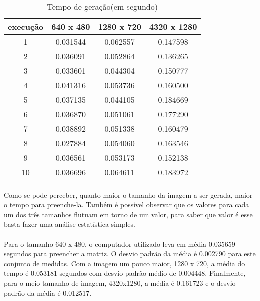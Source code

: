 \documentclass{article}
\begin{document}
	\begin{table}[ht]
	\caption{Tempo de geração(em segundo)}
	\centering
	\begin{tabular}{c c c c}
	\hline\hline
	execução & 640 x 480 & 1280 x 720 & 4320 x 1280\\
	\hline
	1 & 0.031544 & 0.062557 & 0.147598\\
	2 & 0.036091 & 0.052864 & 0.136265\\
	3 & 0.033601 & 0.044304 & 0.150777\\
	4 & 0.041316 & 0.053736 & 0.160500\\
	5 & 0.037135 & 0.044105 & 0.184669\\
	6 & 0.036870 & 0.051061 & 0.177290\\
	7 & 0.038892 & 0.051338 & 0.160479\\
	8 & 0.027884 & 0.054060 & 0.163546\\
	9 & 0.036561 & 0.053173 & 0.152138\\
	10 & 0.036696 & 0.064611 & 0.183972\\
	\hline
	\end{tabular}
	\label{table: execucao}
	\end{table}
	\paragraph{}
	Como se pode perceber, quanto maior o tamanho da imagem a ser gerada, maior o tempo para preenche-la. Também é possível observar que os valores para cada um dos três tamanhos flutuam em torno de um valor, para saber que valor é esse basta fazer uma análise estatística simples.
	\paragraph{}
	Para o tamanho 640 x 480, o computador utilizado leva em média 0.035659 segundos para preencher a matriz. O desvio padrão da média é 0.002790 para este conjunto de medidas. Com a imagem um pouco maior, 1280 x 720, a média do tempo é 0.053181 segundos com desvio padrão médio de 0.004448. Finalmente, para o meio tamanho de imagem, 4320x1280, a média é 0.161723 e o desvio padrão da média é 0.012517.
\end{document}
